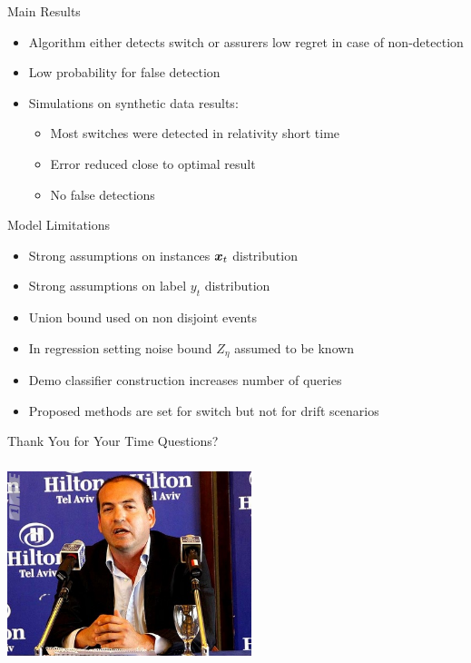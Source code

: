 \documentclass{beamer}
\begin{document}
\begin{frame}{Main Results}
\begin{itemize}
\item Algorithm either detects switch or assurers low regret in case of non-detection\newline
\item Low probability for false detection\newline
\item Simulations on synthetic data results:\newline

\begin{itemize}
\item Most switches were detected in relativity short time\newline
\item Error reduced close to optimal result\newline
\item No false detections
\end{itemize}
\end{itemize}
\end{frame}


\begin{frame}{Model Limitations}
\begin{itemize}
\item Strong assumptions on instances ${\boldsymbol{x}}_{t}$ distribution \newline
\item Strong assumptions on label $y_t$ distribution\newline
\item Union bound used on non disjoint events\newline
\item In regression setting noise bound $Z_{\eta}$ assumed to be known\newline
\item Demo classifier construction increases number of queries \newline
\item Proposed methods are set for switch but not for drift scenarios
\end{itemize}
\end{frame}



\begin{frame}{Thank You for Your Time}
Questions?
\begin{center}
\includegraphics[height=2.3in,width=2.8in]{berko.jpg}
\end{center}

\end{frame}
\end{document}
